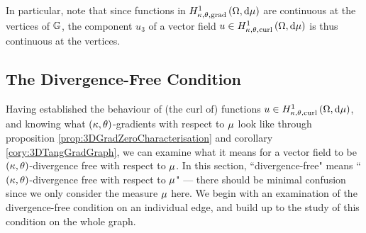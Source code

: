 In particular, note that since functions in $H^1_{\kappa,\theta,\mathrm{grad}}\left( \Omega, \mathrm{d}\mu \right)$ are continuous at the vertices of $\mathbb{G}$, the component $u_3$ of a vector field $u\in H^1_{\kappa,\theta,\mathrm{curl}}\left( \Omega, \mathrm{d}\mu \right)$ is thus continuous at the vertices.

\subsection{The Divergence-Free Condition} \label{apps:DivFreeEdge}
Having established the behaviour of (the curl of) functions $u\in H^1_{\kappa,\theta,\mathrm{curl}}\left( \Omega, \mathrm{d}\mu \right)$, and knowing what $\left( \kappa, \theta \right)$-gradients with respect to $\mu$ look like through proposition \ref{prop:3DGradZeroCharacterisation} and corollary \ref{cory:3DTangGradGraph}, we can examine what it means for a vector field to be $\left( \kappa, \theta \right)$-divergence free with respect to $\mu$.
In this section, ``divergence-free" means ``$\left( \kappa, \theta \right)$-divergence free with respect to $\mu$" --- there should be minimal confusion since we only consider the measure $\mu$ here.
We begin with an examination of the divergence-free condition on an individual edge, and build up to the study of this condition on the whole graph.

